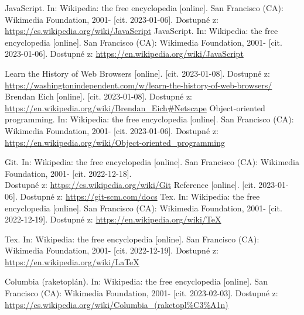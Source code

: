 \documentclass[main.tex]{subfiles}
\begin{document}
\begin{thebibliography}{99}
 JavaScript. In: Wikipedia: the free encyclopedia [online]. San Francisco (CA): Wikimedia Foundation, 2001- [cit. 2023-01-06]. Dostupné z: \url{https://cs.wikipedia.org/wiki/JavaScript}
 JavaScript. In: Wikipedia: the free encyclopedia [online]. San Francisco (CA): Wikimedia Foundation, 2001- [cit. 2023-01-06]. Dostupné z: \url{https://en.wikipedia.org/wiki/JavaScript}

 Learn the History of Web Browsers [online]. [cit. 2023-01-08]. Dostupné z: \url{https://washingtonindependent.com/w/learn-the-history-of-web-browsers/}
 Brendan Eich [online]. [cit. 2023-01-08]. Dostupné z: \url{https://en.wikipedia.org/wiki/Brendan\_Eich#Netscape}
Object-oriented programming. In: Wikipedia: the free encyclopedia [online]. San Francisco (CA): Wikimedia Foundation, 2001- [cit. 2023-01-06]. Dostupné z: \url{https://en.wikipedia.org/wiki/Object-oriented\_programming}

 Git. In: Wikipedia: the free encyclopedia [online]. San Francisco (CA): Wikimedia Foundation, 2001- [cit. 2022-12-18].\\ Dostupné z: \url{https://cs.wikipedia.org/wiki/Git}
 Reference [online]. [cit. 2023-01-06]. Dostupné z: \url{https://git-scm.com/docs}
 Tex. In: Wikipedia: the free encyclopedia [online]. San Francisco (CA): Wikimedia Foundation, 2001- [cit. 2022-12-19]. Dostupné z: \url{https://en.wikipedia.org/wiki/TeX}

 Tex. In: Wikipedia: the free encyclopedia [online]. San Francisco (CA): Wikimedia Foundation, 2001- [cit. 2022-12-19]. Dostupné z: \url{https://en.wikipedia.org/wiki/LaTeX}



 Columbia (raketoplán). In: Wikipedia: the free encyclopedia [online]. San Francisco (CA): Wikimedia Foundation, 2001- [cit. 2023-02-03]. Dostupné z: \url{https://cs.wikipedia.org/wiki/Columbia\_(raketopl\%C3\%A1n) }

\end{thebibliography}
\end{document}
